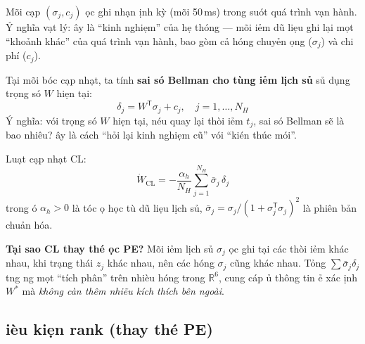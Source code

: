 \documentclass[12pt,a4paper]{article}
\newcommand{\R}{\mathbb{R}}
\newcommand{\T}{\mathsf{T}}
\begin{document}
M\~{o}i c\d{a}p $(\sigma_j, c_j)$ \dj\uhorn{}\d{o}c ghi nh\d{a}n \dj\d{i}nh k\`{y} (m\~{o}i 50\,ms) trong su\'{o}t qu\'{a} tr\`{i}nh v\d{a}n h\`{a}nh. \'{Y} ngh\~{i}a v\d{a}t l\'{y}: \dj\^{a}y l\`{a} ``kinh nghi\d{e}m'' c\h{u}a h\d{e} th\'{o}ng --- m\~{o}i \dj i\h{e}m d\~{u} li\d{e}u ghi l\d{a}i m\d{o}t ``kho\h{a}nh kh\'{a}c'' c\h{u}a qu\'{a} tr\`{i}nh v\d{a}n h\`{a}nh, bao g\`{o}m c\h{a} h\uhorn{}\'{o}ng chuy\h{e}n \dj\d{o}ng ($\sigma_j$) v\`{a} chi ph\'{i} ($c_j$).

T\d{a}i m\~{o}i b\uhorn{}\'{o}c c\d{a}p nh\d{a}t, ta t\'{i}nh \textbf{sai s\'{o} Bellman cho t\`{u}ng \dj i\h{e}m l\d{i}ch s\h{u}} s\h{u} d\d{u}ng tr\d{o}ng s\'{o} $W$ hi\d{e}n t\d{a}i:
\begin{equation}\label{eq:delta_hist}
    \delta_j = W^\T \sigma_j + c_j, \quad j = 1, \ldots, N_H
\end{equation}
\'{Y} ngh\~{i}a: v\'{o}i tr\d{o}ng s\'{o} $W$ hi\d{e}n t\d{a}i, n\'{e}u quay l\d{a}i th\`{o}i \dj i\h{e}m $t_j$, sai s\'{o} Bellman s\~{e} l\`{a} bao nhi\^{e}u? \DJ\^{a}y l\`{a} c\'{a}ch ``h\h{o}i l\d{a}i kinh nghi\d{e}m c\~{u}'' v\'{o}i ``ki\'{e}n th\'{u}c m\'{o}i''.

Lu\d{a}t c\d{a}p nh\d{a}t CL:
\begin{equation}\label{eq:cl_update}
    \dot{W}_\text{CL} = -\frac{\alpha_h}{N_H} \sum_{j=1}^{N_H} \bar{\sigma}_j\, \delta_j
\end{equation}
trong \dj\'{o} $\alpha_h > 0$ l\`{a} t\'{o}c \dj\d{o} h\d{o}c t\`{u} d\~{u} li\d{e}u l\d{i}ch s\h{u}, $\bar{\sigma}_j = \sigma_j / (1 + \sigma_j^\T \sigma_j)^2$ l\`{a} phi\^{e}n b\h{a}n chu\h{a}n h\'{o}a.

\textbf{T\d{a}i sao CL thay th\'{e} \dj\uhorn{}\d{o}c PE?} M\~{o}i \dj i\h{e}m l\d{i}ch s\h{u} $\sigma_j$ \dj\uhorn{}\d{o}c ghi t\d{a}i c\'{a}c th\`{o}i \dj i\h{e}m kh\'{a}c nhau, khi tr\d{a}ng th\'{a}i $z_j$ kh\'{a}c nhau, n\^{e}n c\'{a}c h\uhorn{}\'{o}ng $\sigma_j$ c\~{u}ng kh\'{a}c nhau. T\h{o}ng $\sum \bar{\sigma}_j \delta_j$ t\uhorn{}\ohorn{}ng \dj\uhorn{}\ohorn{}ng m\d{o}t ``t\'{i}ch ph\^{a}n'' tr\^{e}n nhi\`{e}u h\uhorn{}\'{o}ng trong $\R^6$, cung c\'{a}p \dj\h{u} th\^{o}ng tin \dj\h{e} x\'{a}c \dj\d{i}nh $W^*$ m\`{a} \textit{kh\^{o}ng c\`{a}n th\^{e}m nhi\~{e}u k\'{i}ch th\'{i}ch b\^{e}n ngo\`{a}i}.

\subsection{\DJ i\`{e}u ki\d{e}n rank (thay th\'{e} PE)}
\end{document}
